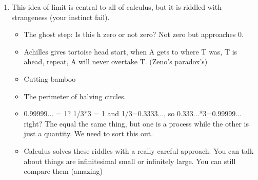 \documentclass{article}
\begin{document}
\begin{enumerate}
\item This idea of limit is central to all of calculus, but it is riddled with strangeness (your instinct fail).
\begin{itemize}
\item The ghost step: Is this h zero or not zero? Not zero but approaches $0$.
\item Achilles gives tortoise head start, when A gets to where T was, T is ahead, repeat, A will never overtake T. (Zeno's paradox's)
\item Cutting bamboo
\item The perimeter of halving circles.
\item 0.99999... = 1? 1/3*3 = 1 and 1/3=0.3333..., so 0.333...*3=0.99999... right? The equal the same thing, but one is a process while the other is just a quantity. We need to sort this out.
\item Calculus solves these riddles with a really careful approach. You can talk about things are infinitesimal small or infinitely large. You can still compare them (amazing)
\end{itemize}
\end{enumerate}


\end{document}
